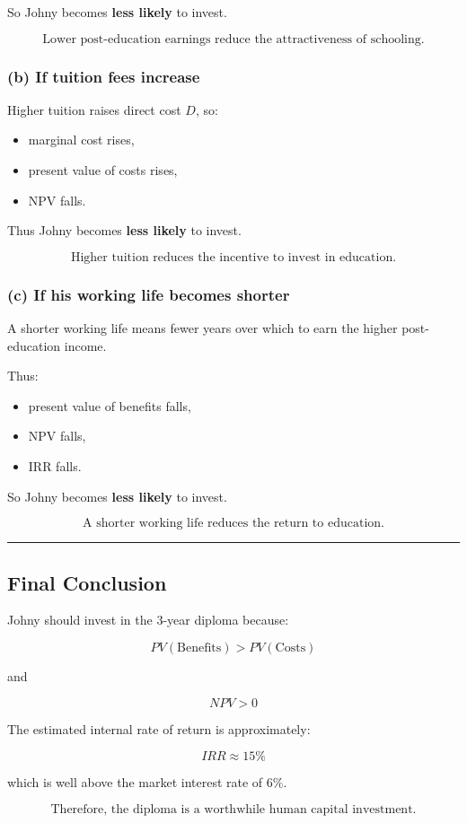 \documentclass[12pt]{article}
\begin{document}
So Johny becomes \textbf{less likely} to invest.

\[
\boxed{\text{Lower post-education earnings reduce the attractiveness of schooling.}}
\]

\subsubsection*{(b) If tuition fees increase}

Higher tuition raises direct cost \(D\), so:
\begin{itemize}
    \item marginal cost rises,
    \item present value of costs rises,
    \item NPV falls.
\end{itemize}

Thus Johny becomes \textbf{less likely} to invest.

\[
\boxed{\text{Higher tuition reduces the incentive to invest in education.}}
\]

\subsubsection*{(c) If his working life becomes shorter}

A shorter working life means fewer years over which to earn the higher post-education income.

Thus:
\begin{itemize}
    \item present value of benefits falls,
    \item NPV falls,
    \item IRR falls.
\end{itemize}

So Johny becomes \textbf{less likely} to invest.

\[
\boxed{\text{A shorter working life reduces the return to education.}}
\]

\hrule
\vspace{0.8em}

\subsection*{Final Conclusion}

Johny should invest in the 3-year diploma because:

\[
PV(\text{Benefits}) > PV(\text{Costs})
\]

and

\[
NPV > 0
\]

The estimated internal rate of return is approximately:

\[
\boxed{IRR \approx 15\%}
\]

which is well above the market interest rate of \(6\%\).

\[
\boxed{\text{Therefore, the diploma is a worthwhile human capital investment.}}
\]
\end{document}
